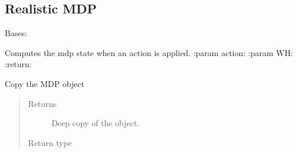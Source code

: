 \documentclass[letterpaper,10pt,english]{sphinxmanual}
\begin{document}
\subsection{Realistic MDP}
\label{\detokenize{package1bis:module-mdp_realistic}}\label{\detokenize{package1bis:realistic-mdp}}

\begin{fulllineitems}
\label{\detokenize{package1bis:mdp_realistic.mdp_realistic}}
Bases: 

\begin{fulllineitems}
\label{\detokenize{package1bis:mdp_realistic.mdp_realistic.computeState}}
Computes the mdp state when an action is applied.
:param action:
:param WH:
:return:

\end{fulllineitems}


\begin{fulllineitems}
\label{\detokenize{package1bis:mdp_realistic.mdp_realistic.copy}}
Copy the MDP object
\begin{quote}\begin{description}
\item[{Returns}] \leavevmode
Deep copy of the object.

\item[{Return type}] \leavevmode
{\hyperref[\detokenize{package1:mdp.MDP}]{}}

\end{description}\end{quote}

\end{fulllineitems}


\begin{fulllineitems}
\label{\detokenize{package1bis:mdp_realistic.mdp_realistic.extractSimulationData}}
\end{fulllineitems}


\end{fulllineitems}
\end{document}
